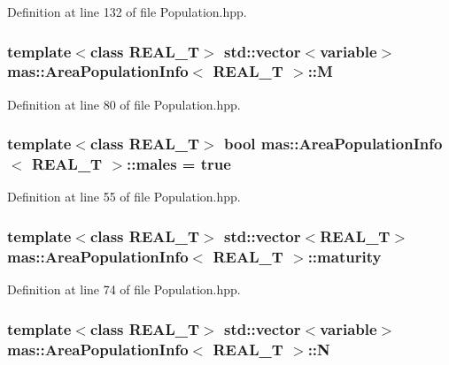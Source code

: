 Definition at line 132 of file Population.\-hpp.

\hypertarget{structmas_1_1_area_population_info_aefb43fab9ad2e986901994bb4212ab18}{
\subsubsection[{M}]{\setlength{\rightskip}{0pt plus 5cm}template$<$class R\-E\-A\-L\-\_\-\-T$>$ std\-::vector$<${\bf variable}$>$ {\bf mas\-::\-Area\-Population\-Info}$<$ R\-E\-A\-L\-\_\-\-T $>$\-::M}}\label{structmas_1_1_area_population_info_aefb43fab9ad2e986901994bb4212ab18}


Definition at line 80 of file Population.\-hpp.

\hypertarget{structmas_1_1_area_population_info_a59115f3aefbc75978d3f83911119cbaa}{
\subsubsection[{males}]{\setlength{\rightskip}{0pt plus 5cm}template$<$class R\-E\-A\-L\-\_\-\-T$>$ bool {\bf mas\-::\-Area\-Population\-Info}$<$ R\-E\-A\-L\-\_\-\-T $>$\-::males = true}}\label{structmas_1_1_area_population_info_a59115f3aefbc75978d3f83911119cbaa}


Definition at line 55 of file Population.\-hpp.

\hypertarget{structmas_1_1_area_population_info_a69512a2ac34572e7c292d2378fe4042d}{
\subsubsection[{maturity}]{\setlength{\rightskip}{0pt plus 5cm}template$<$class R\-E\-A\-L\-\_\-\-T$>$ std\-::vector$<$R\-E\-A\-L\-\_\-\-T$>$ {\bf mas\-::\-Area\-Population\-Info}$<$ R\-E\-A\-L\-\_\-\-T $>$\-::maturity}}\label{structmas_1_1_area_population_info_a69512a2ac34572e7c292d2378fe4042d}


Definition at line 74 of file Population.\-hpp.

\hypertarget{structmas_1_1_area_population_info_a165249a99c59b7544c773822c73f98ab}{
\subsubsection[{N}]{\setlength{\rightskip}{0pt plus 5cm}template$<$class R\-E\-A\-L\-\_\-\-T$>$ std\-::vector$<${\bf variable}$>$ {\bf mas\-::\-Area\-Population\-Info}$<$ R\-E\-A\-L\-\_\-\-T $>$\-::N}}\label{structmas_1_1_area_population_info_a165249a99c59b7544c773822c73f98ab}



